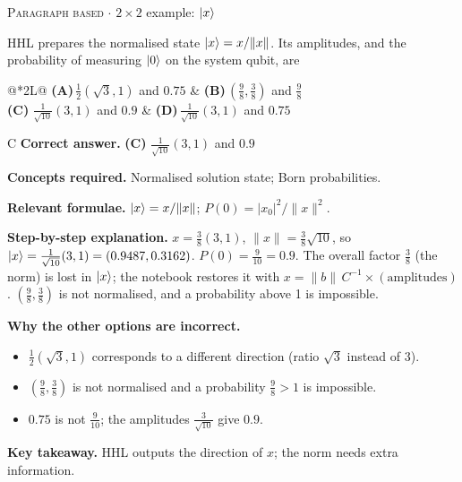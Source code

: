 \documentclass[11pt,a4paper]{article}
\newcommand{\optlabel}[1]{\textbf{(#1)}}
\newcommand{\correctlabel}[1]{\textcolor{okgreen}{\textbf{(#1)}\,\ding{51}}}
\newenvironment{qitem}[1]{\begin{list}{}{\setlength{\leftmargin}{3.3em}\setlength{\labelwidth}{3.1em}%
  \setlength{\labelsep}{0.2em}\setlength{\topsep}{3pt}\setlength{\parsep}{3pt}}\item[\textbf{Q.#1}\hfill]}{\end{list}}
\newcommand{\qsep}{\par\vspace{2pt}{\color{black!15}\hrule}\vspace{4pt}}
\newcommand{\qmeta}[2]{{\footnotesize\color{black!60}\textsc{#1} \;$\cdot$\; #2}\par}
\begin{document}
\begin{qitem}{15}
\qmeta{Paragraph based}{$2\times2$ example: $\ket x$}
HHL prepares the normalised state $\ket x = x/\|x\|$. Its amplitudes, and the probability of measuring $\ket0$ on the system qubit, are
\par\smallskip\noindent\begin{tabularx}{\linewidth}{@{}*{2}{L}@{}}
\optlabel{A}\,$\tfrac12(\sqrt3, 1)$ and $0.75$ & \optlabel{B}\,$(\tfrac98, \tfrac38)$ and $\tfrac98$ \\[3pt]
\correctlabel{C}\,$\tfrac{1}{\sqrt{10}}(3, 1)$ and $0.9$ & \optlabel{D}\,$\tfrac{1}{\sqrt{10}}(3, 1)$ and $0.75$
\end{tabularx}
\end{qitem}
\begin{solbox}{C}
\textbf{\color{brand}Correct answer.} \textcolor{okgreen}{\textbf{(C)}} $\tfrac{1}{\sqrt{10}}(3, 1)$ and $0.9$

\textbf{\color{brand}Concepts required.} Normalised solution state; Born probabilities.

\textbf{\color{brand}Relevant formulae.} $\ket x = x/\|x\|$; $P(0) = |x_0|^2/\|x\|^2$.

\textbf{\color{brand}Step-by-step explanation.} $x = \tfrac38(3, 1)$, $\|x\| = \tfrac38\sqrt{10}$, so $\ket x = \tfrac{1}{\sqrt{10}}(3, 1) = (0.9487, 0.3162)$. $P(0) = \tfrac{9}{10} = 0.9$. The overall factor $\tfrac38$ (the norm)
is lost in $\ket x$; the notebook restores it with $x = \|b\|\,C^{-1}\times(\text{amplitudes})$. $(\tfrac98, \tfrac38)$ is not normalised, and a probability above 1 is impossible.

\textbf{\color{brand}Why the other options are incorrect.}
\begin{itemize}[leftmargin=2.4em, itemsep=1pt, topsep=2pt]
\item[\textbf{(A)}] $\frac12(\sqrt3, 1)$ corresponds to a different direction (ratio $\sqrt3$ instead of $3$).
\item[\textbf{(B)}] $(\frac98, \frac38)$ is not normalised and a probability $\frac98 > 1$ is impossible.
\item[\textbf{(D)}] $0.75$ is not $\frac{9}{10}$; the amplitudes $\frac{3}{\sqrt{10}}$ give $0.9$.
\end{itemize}
\textbf{\color{brand}Key takeaway.} HHL outputs the direction of $x$; the norm needs extra information.
\end{solbox}
\qsep
\end{document}
